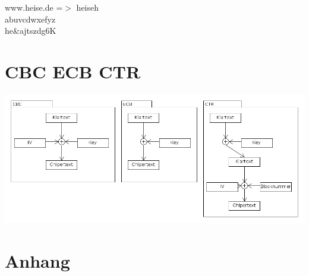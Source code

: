 \documentclass[12pt,a4paper,oneside,ngerman]{article}
\begin{document}
www.heise.de =$>$ heiseh\\
abuvcdwxefyz\\
he\&ajtszdg6K\\

\section{CBC ECB CTR}
\includegraphics[scale=0.5]{cbc_ecb_ctr.png}

\section{Anhang}






\end{document}
